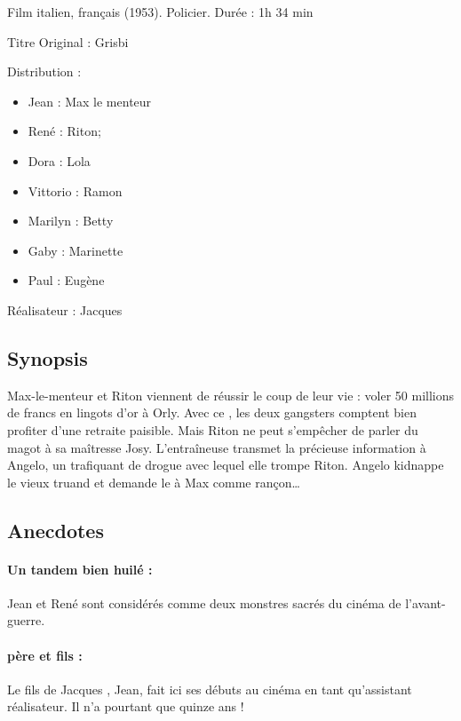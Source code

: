 Film italien, français (1953). Policier. Durée : 1h 34 min

Titre Original : Grisbi

Distribution :

\begin{itemize}
	\item Jean  : Max le menteur	
	\item René  : Riton;
	\item Dora  : Lola	
	\item Vittorio  : Ramon	
	\item Marilyn  : Betty	
	\item Gaby  : Marinette	
	\item Paul  : Eugène
\end{itemize}

Réalisateur : Jacques 


\subsection*{Synopsis}

Max-le-menteur et Riton viennent de réussir le coup de leur vie : voler 50 millions de francs en lingots d'or à Orly. Avec ce , les deux gangsters comptent bien profiter d'une retraite paisible. Mais Riton ne peut s'empêcher de parler du magot à sa maîtresse Josy. L'entraîneuse transmet la précieuse information à Angelo, un trafiquant de drogue avec lequel elle trompe Riton. Angelo kidnappe le vieux truand et demande le  à Max comme rançon\dots


\subsection*{Anecdotes}

\paragraph{Un tandem bien huilé :} Jean  et René  sont considérés comme deux monstres sacrés du cinéma de l'avant-guerre.

\paragraph{ père et fils :} Le fils de Jacques , Jean, fait ici ses débuts au cinéma en tant qu'assistant réalisateur. Il n'a pourtant que quinze ans !

